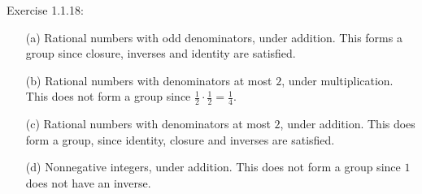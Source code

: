 \documentclass[11pt]{scrreport}
\begin{document}
\begin{example}
    Exercise 1.1.18:
    \begin{itemize}
        \item[(a)] Rational numbers with odd denominators, under addition. This forms a group since closure, inverses and identity are satisfied.
        \item[(b)] Rational numbers with denominators at most $2$, under multiplication. This does not form a group since $\frac12 \cdot \frac12 = \frac14$.
        \item[(c)] Rational numbers with denominators at most $2$, under addition. This does form a group, since identity, closure and inverses are satisfied.
        \item[(d)] Nonnegative integers, under addition. This does not form a group since $1$ does not have an inverse.
    \end{itemize}
\end{example}
\end{document}
